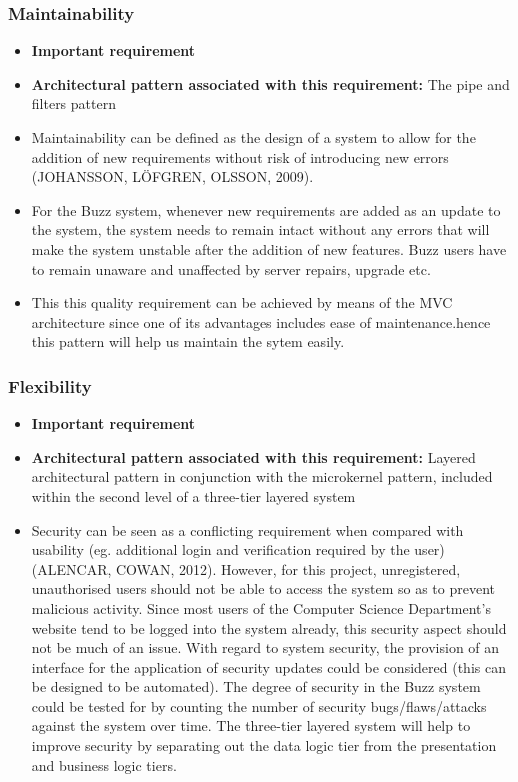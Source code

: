 \documentclass[a4paper]{article}
\begin{document}
\subsubsection{Maintainability}
\begin{itemize}
	\item \textbf{Important requirement}
	\item \textbf{Architectural pattern associated with this requirement:} The pipe and filters pattern 
	\item Maintainability can be defined as the design of a system to allow for the addition of new requirements without risk of introducing new errors (JOHANSSON, LÖFGREN, OLSSON, 2009). 
	\item For the Buzz system, whenever new requirements are added as an update to the system, the system needs to remain intact without any
errors that will make the system unstable after the addition of new features. Buzz users have to remain unaware and unaffected by server repairs, upgrade etc. 
\item This this quality requirement can be achieved by means of the MVC architecture since one of its advantages includes ease of maintenance.hence this pattern will help us maintain the sytem easily.

\end{itemize}


\subsubsection{Flexibility}
\begin{itemize}
	\item \textbf{Important requirement}
	\item \textbf{Architectural pattern associated with this requirement:} Layered
		architectural pattern in conjunction with the microkernel pattern, included within the second level of a three-tier layered system
	\item Security can be seen as a conflicting requirement when compared with usability (eg. additional login and verification required by the user) (ALENCAR, COWAN, 2012). However, for this project, unregistered, unauthorised users should not be able to access the system so as to prevent malicious activity. Since most users of the Computer Science Department’s website tend to be logged into the system already, this security aspect should not be much of an issue. With regard to system security, the provision of an interface for the application of security updates could be considered (this can be designed to be automated). The degree of security in the Buzz system could be tested for by counting the number of security bugs/flaws/attacks against the system over time. The three-tier layered system will help to improve security by separating out the data logic tier from the presentation and business logic tiers.
\end{itemize}
\end{document}
